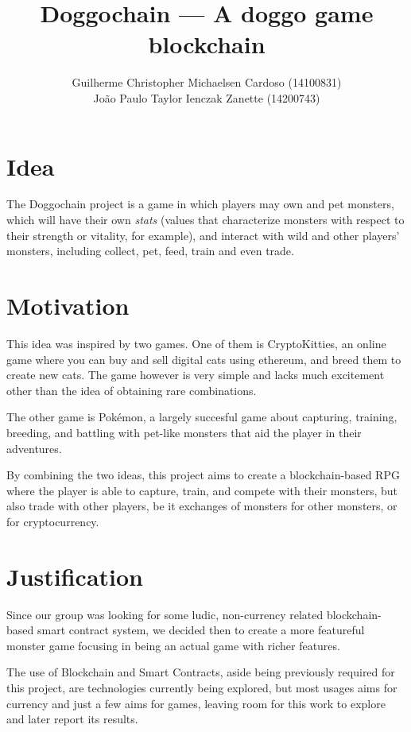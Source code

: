 \documentclass{article}
\title{Doggochain --- A doggo game blockchain}
\author{%
    Guilherme Christopher Michaelsen Cardoso (14100831) \\
    João Paulo Taylor Ienczak Zanette (14200743)
}
\begin{document}
    \maketitle

    \section{Idea}

    The Doggochain project is a game in which players may own and pet monsters,
    which will have their own \textit{stats} (values that characterize monsters
    with respect to their strength or vitality, for example), and interact with
    wild and other players' monsters, including collect, pet, feed, train and
    even trade.

    \section{Motivation}

    This idea was inspired by two games. One of them is CryptoKitties, an online
    game where you can buy and sell digital cats using ethereum, and breed them to 
    create new cats. The game however is very simple and lacks much excitement other 
    than the idea of obtaining rare combinations. 

    The other game is Pokémon, a largely succesful game about capturing, training,
    breeding, and battling with pet-like monsters that aid the player in their adventures.
    
    By combining the two ideas, this project aims to create a blockchain-based RPG 
    where the player is able to capture, train, and compete with their monsters, but also 
    trade with other players, be it exchanges of monsters for other monsters, or for cryptocurrency.

    \section{Justification}

    Since our group was looking for some ludic, non-currency related
    blockchain-based smart contract system, we decided then to create a more
    featureful monster game focusing in being an actual game with richer
    features.

    The use of Blockchain and Smart Contracts, aside being previously required
    for this project, are technologies currently being explored, but most
    usages aims for currency and just a few aims for games, leaving room for
    this work to explore and later report its results. 
\end{document}
